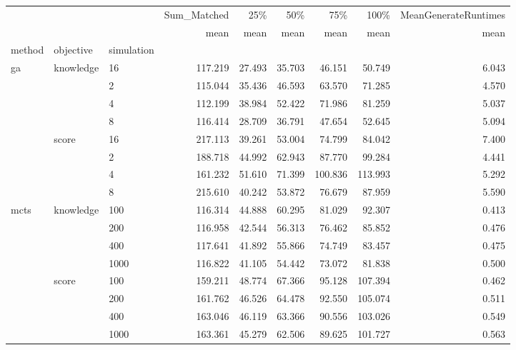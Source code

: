 \begin{tabular}{lllrrrrrr}
\toprule
         &   &    & Sum\_Matched &    25\% &     50\% &     75\% &    100\% & MeanGenerateRuntimes \\
         &   &    &        mean &   mean &    mean &    mean &    mean &                 mean \\
method & objective & simulation &             &        &         &         &         &                      \\
\midrule
ga & knowledge & 16 &     117.219 & 27.493 &  35.703 &  46.151 &  50.749 &                6.043 \\
         &   & 2 &     115.044 & 35.436 &  46.593 &  63.570 &  71.285 &                4.570 \\
         &   & 4 &     112.199 & 38.984 &  52.422 &  71.986 &  81.259 &                5.037 \\
         &   & 8 &     116.414 & 28.709 &  36.791 &  47.654 &  52.645 &                5.094 \\
         & score & 16 &     217.113 & 39.261 &  53.004 &  74.799 &  84.042 &                7.400 \\
         &   & 2 &     188.718 & 44.992 &  62.943 &  87.770 &  99.284 &                4.441 \\
         &   & 4 &     161.232 & 51.610 &  71.399 & 100.836 & 113.993 &                5.292 \\
         &   & 8 &     215.610 & 40.242 &  53.872 &  76.679 &  87.959 &                5.590 \\
mcts & knowledge & 100 &     116.314 & 44.888 &  60.295 &  81.029 &  92.307 &                0.413 \\
         &   & 200 &     116.958 & 42.544 &  56.313 &  76.462 &  85.852 &                0.476 \\
         &   & 400 &     117.641 & 41.892 &  55.866 &  74.749 &  83.457 &                0.475 \\
         &   & 1000 &     116.822 & 41.105 &  54.442 &  73.072 &  81.838 &                0.500 \\
         & score & 100 &     159.211 & 48.774 &  67.366 &  95.128 & 107.394 &                0.462 \\
         &   & 200 &     161.762 & 46.526 &  64.478 &  92.550 & 105.074 &                0.511 \\
         &   & 400 &     163.046 & 46.119 &  63.366 &  90.556 & 103.026 &                0.549 \\
         &   & 1000 &     163.361 & 45.279 &  62.506 &  89.625 & 101.727 &                0.563 \\

\end{tabular}
